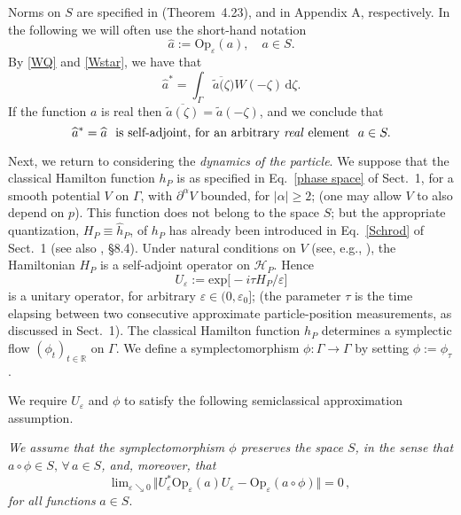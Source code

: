 \documentclass[12pt]{article}
\begin{document}
Norms on $S$ are specified in \cite{Zworski} (Theorem~4.23), and in Appendix A, respectively.
 In the following we will often use the short-hand notation
$$\widehat{a}:= \text{Op}_{\varepsilon} (a), \quad a\in S.$$
By \eqref{WQ} and \eqref{Wstar}, we have that
$$\widehat{a}^{*} =\int_{\Gamma} \overline{\tilde{a}(\zeta}) W(-\zeta)\,\text{d}\zeta.$$
 If the function $a$ is real then $\overline{\tilde{a}(\zeta)}=\tilde{a}(-\zeta)$, and we  conclude that 
 $$\widehat{a}^{*} = \widehat{a} \,\,\text{ is self-adjoint}, \, \text{for an arbitrary \textit{real} element }\,\, a\in S.$$
 
 Next, we return to considering the \textit{dynamics of the particle}. We suppose that the classical Hamilton function $h_P$ 
 is as specified in Eq.~\eqref{phase space} of Sect.~1, for a smooth potential $V$ on $\Gamma$, with $\partial^{\alpha}V$ 
 bounded, for $\vert \alpha \vert \geq 2$; (one may allow $V$ to also depend on $p$). This function does not belong to the 
 space $S$; but the appropriate  quantization, $H_P\equiv \widehat{h}_P$, of $h_P$ has already been introduced 
 in Eq.~\eqref{Schrod} of Sect.~1 (see also \cite{DerGerard}, \S 8.4). Under natural conditions on $V$ (see, e.g., \cite{BS}), the Hamiltonian $H_P$ 
 is a self-adjoint operator on $\mathcal{H}_P$. 
 Hence 
 \begin{equation}\label{propagator}
 U_{\varepsilon} := \text{exp}\big[-i \tau H_P/\varepsilon \big]
 \end{equation}
 is a unitary operator, for arbitrary $\varepsilon \in (0, \varepsilon_0]$;  (the parameter $\tau$ is the time elapsing 
 between two consecutive approximate particle-position measurements, as discussed in Sect.~1). The classical 
 Hamilton function $h_P$ determines a symplectic flow $(\phi_t)_{t\in \mathbb{R}}$ on $\Gamma$. 
 We define a symplectomorphism $\phi: \Gamma \rightarrow \Gamma$ by setting $\phi:= \phi_{\tau}$. 
  
We require $U_{\varepsilon}$ and $\phi$ to satisfy the following semiclassical approximation assumption.%

\vspace{0.15cm} \textit{We assume that the symplectomorphism $\phi$ preserves the space $S$, 
in the sense that $a\circ \phi \in S, \,\forall \, a\in S$, and, moreover, that}
\begin{equation}\label{Egorov}
\text{lim}_{\varepsilon \searrow 0}\, \Vert U_{\varepsilon}^{*} \text{Op}_{\varepsilon}(a)U_{\varepsilon} - 
\text{Op}_{\varepsilon}(a\circ \phi) \Vert =0\,,
\end{equation}
\textit{ for all functions} $a\in S$.\\
\end{document}
